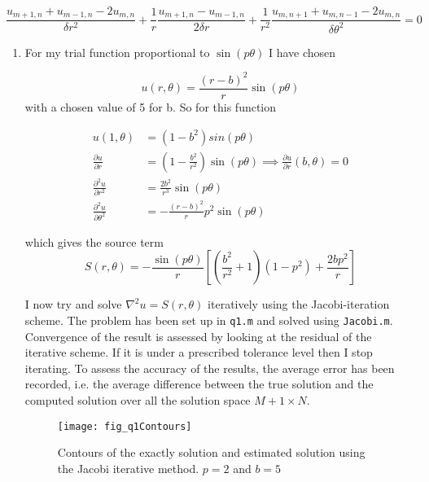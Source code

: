 \documentclass{article}
\begin{document}
\begin{equation}
	\frac{u_{m+1,n} + u_{m-1,n} - 2u_{m,n}}{\delta r^2} + \frac{1}{r}\frac{u_{m+1,n} - u_{m-1,n}}{2\delta r} + \frac{1}{r^2}\frac{u_{m,n+1} + u_{m,n-1} - 2u_{m,n}}{\delta \theta^2} = 0
\end{equation}

\begin{enumerate}
	\item For my trial function proportional to $\sin(p\theta)$ I have chosen
	
	\begin{equation}
		u(r, \theta) = \frac{(r-b)^2}{r} \sin(p \theta)
	\end{equation}
	with a chosen value of 5 for b.
	So for this function 
	
	\begin{equation*}
	\begin{split}
		u(1,\theta) &= (1-b^2) sin(p \theta) \\
		\frac{\partial u}{\partial r} &= (1-\frac{b^2}{r^2}) \sin(p \theta) \implies \frac{\partial u}{\partial r} (b, \theta) = 0 \\
		 \frac{\partial^2 u}{\partial r^2} &= \frac{2b^2}{r^3} \sin(p \theta) \\
		\frac{\partial^2 u}{\partial \theta^2} &= -\frac{(r-b)^2}{r}p^2 \sin(p\theta)
	\end{split}
	\end{equation*}
	
	which gives the source term
	\begin{equation*}
		S(r,\theta) = - \frac{\sin(p \theta)}{r} [ (\frac{b^2}{r^2} + 1)(1 - p^2) + \frac{2bp^2}{r} ] 
	\end{equation*}
	
	I now try and solve $\nabla^2 u = S(r,\theta)$ iteratively using the Jacobi-iteration scheme. The problem has been set up in \texttt{q1.m} and solved using \texttt{Jacobi.m}. Convergence of the result is assessed by looking at the residual of the iterative scheme. If it is under a prescribed tolerance level then I stop iterating. To assess the accuracy of the results, the average error has been recorded, i.e. the average difference between the true solution and the computed solution over all the solution space $M+1 \times N$.
	
	\begin{figure}[h!]
		\centering
		\texttt{[image: fig\_q1Contours]}
		\caption{Contours of the exactly solution and estimated solution using the Jacobi iterative method. $p=2$ and $b=5$}
	\end{figure}
	

\end{enumerate}
\end{document}
